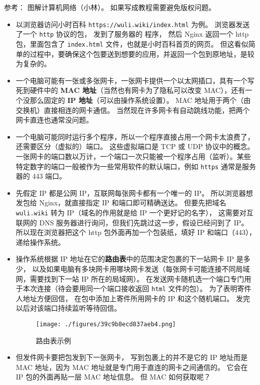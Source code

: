 
\begin{issues}
\issueDraft
\end{issues}

参考： 图解计算机网络（小林）。 如果写成教程需要避免版权问题。

\begin{itemize}
\item 以浏览器访问小时百科 \verb`https://wuli.wiki/index.html` 为例。 浏览器发送了一个 \verb`http` 协议的包， 发到了服务器的  程序， 然后 Nginx 返回一个 http 包，里面包含了 \verb`index.html` 文件，也就是小时百科首页的网页。 但这看似简单的过程中，要确保这个包要送到想要的应用，并返回一个包到原地址，是较为复杂的。
\item 一个电脑可能有一张或多张网卡，一张网卡提供一个以太网插口，具有一个写死到硬件中的 \textbf{MAC 地址}（当然也有网卡为了隐私可以改变 MAC），还有一个没那么固定的 \textbf{IP 地址}（可以由操作系统设置）。 MAC 地址用于两个（由交换机）直接相连的网卡通信。 当然现在许多网卡有自动跳线功能，把两个网卡直连也通常没问题。
\item 一个电脑可能同时运行多个程序，所以一个程序直接占用一个网卡太浪费了，还需要区分（虚拟的）端口。 这些虚拟端口是 TCP 或 UDP 协议中的概念。 一张网卡的端口数以万计，一个端口一次只能被一个程序占用（监听）。某些特定数字的端口一般被作为一些常用软件的默认端口，例如 \verb`https` 通常是服务器的 443 端口。
\item 先假定 IP 都是公网 IP，互联网每张网卡都有一个唯一的 IP。 所以浏览器想发包给 Nginx，就直接指定 IP 和端口即可精确送达。 但要先把域名 \verb`wuli.wiki` 转为 IP（域名的作用就是给 IP 一个更好记的名字）， 这需要对互联网的 DNS 服务器进行询问，但我们先跳过这一步，假设已经问到了 IP。 所以现在浏览器把这个 http 包外面再加一个包装纸，填好 IP 和端口（443），递给操作系统。
\item 操作系统根据 IP 地址在它的\textbf{路由表}中的范围决定包裹的下一站网卡 IP 是多少， 以及如果电脑有多块网卡用哪块网卡发送（每张网卡可能连接不同局域网，需要找到下一站 IP 所在的局域网）。 在发送网卡随机选一个端口专门用于本次连接（待会要用同一个端口接收返回 \verb`html` 文件的包）。 为了表明寄件人地址方便回信， 在包中添加上寄件所用网卡的 IP 和这个随机端口。 发完以后对该端口持续监听等待回信。
\begin{figure}[ht]
\centering
\texttt{[image: ./figures/39c9b8ecd837aeb4.png]}
\caption{路由表示例} \label{fig_NetNt_3}
\end{figure}
\item 但发件网卡要把包发到下一张网卡， 写到包裹上的并不是它的 IP 地址而是 MAC 地址，因为 MAC 地址就是专门用于直连的网卡之间通信的。 它会在 IP 包的外面再贴一层 MAC 地址信息。 但 MAC 如何获取呢？

\end{itemize}
